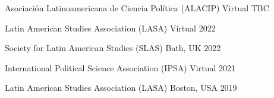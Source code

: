 






\vspace{1mm}

\begin{cvhonors}
\cvconf
{Asociación Latinoamericana de Ciencia Política (ALACIP)} 
{Virtual}
{TBC}
\end{cvhonors}

\begin{cvhonors}
\cvconf
{Latin American Studies Association (LASA)} 
{Virtual}
{2022}
\end{cvhonors}

\begin{cvhonors}
\cvconf
{Society for Latin American Studies (SLAS)} 
{Bath, UK}
{2022}
\end{cvhonors}


\begin{cvhonors}
\cvconf
{International Political Science Association (IPSA)} 
{Virtual}
{2021}
\end{cvhonors}

\begin{cvhonors}
\cvconf
{Latin American Studies Association (LASA)} 
{Boston, USA}
{2019}
\end{cvhonors}


